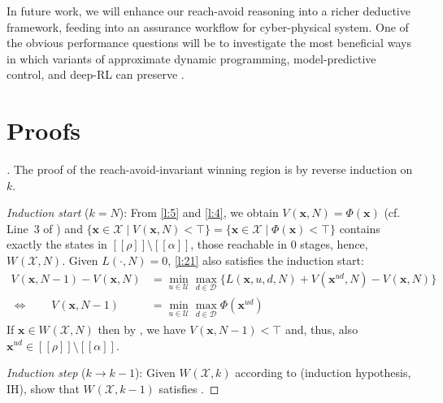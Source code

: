 \documentclass{article}
\newcommand\mkYcAoM[1][]{\mathcal{D}_{#1}}
\newcommand\mpBykPY[1][]{\mathcal{U}_{#1}}
\newcommand\mcrHMQW[1]{[\![#1]\!]}
\newcommand\mijCQyI[1][]{V^{#1}}
\renewcommand\vec[1]{\mathbf{#1}}
\newcommand\mDpbDSN[1][]{W^{#1}}
\begin{document}
{In future work, we will enhance our reach-avoid reasoning into a
richer deductive framework, feeding into an assurance workflow for
cyber-physical system. 
One of the obvious performance questions will be to investigate the
most beneficial ways in which variants of 
approximate dynamic programming, model-predictive control, and deep-RL can preserve
.




\appendix
  \appendix

\section{Proofs}
\label{l:29}
  
\begin{proof}[]
  The proof of the reach-avoid-invariant winning region is by reverse
  induction on $k$.

  \emph{Induction start} ($k=N$):
  From \eqref{l:5} and \eqref{l:4}, we
  obtain $\mijCQyI({\vec{x}},N) =\Phi({\vec{x}})$ (cf.
  Line~3 of ) and
  $\{{\vec{x}}\in\mathcal{X}\mid
  \mijCQyI({\vec{x}},N)<\top\} =
  \{{\vec{x}}\in\mathcal{X}\mid
  \Phi({\vec{x}})<\top\}$ contains exactly the states in
  $\mcrHMQW\rho\setminus\mcrHMQW\alpha$, those reachable in 0 stages,
  hence, $\mDpbDSN(\mathcal{X},N)$.
  Given
  $L(\cdot,N)=0$,
  \eqref{l:21} also satisfies the
  induction start:
  \begin{align*}
    \mijCQyI({\vec{x}},N-1) -
    \mijCQyI({\vec{x}},N)
    &=
    \min_{u\in\mpBykPY}
    \max_{d\in\mkYcAoM}
    \big\{
    L({\vec{x}},u,d,N)%
    +
    \mijCQyI({\vec{x}}^{ud},N) -
    \mijCQyI({\vec{x}},N)
    \big\}
    \\\iff\qquad
    \mijCQyI({\vec{x}},N-1)
    &=
      \min_{u\in\mpBykPY}
      \max_{d\in\mkYcAoM}
      \Phi({\vec{x}}^{ud})
  \end{align*}
  If
  ${\vec{x}}\in\mDpbDSN(\mathcal{X},N)$
  then by , we have
  $\mijCQyI({\vec{x}},N-1)<\top$ and, thus, also
  ${\vec{x}}^{ud}\in
  \mcrHMQW\rho\setminus\mcrHMQW\alpha$. 
  \hfill\resizebox{.5em}{.6em}{/\kern-.5em$\Box$}

  \emph{Induction step} ($k\to k-1$): Given
  $\mDpbDSN(\mathcal{X},k)$ according to
   (induction hypothesis, IH),
  show that
  $\mDpbDSN(\mathcal{X},k-1)$
  satisfies .


\end{proof}}
\end{document}
